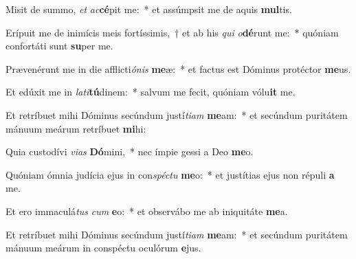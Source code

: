 \item Misit de summo, \textit{et} \textit{ac}\textbf{cé}pit me:~* et assúmpsit me de aquis \textbf{mul}tis.
\item Erípuit me de inimícis meis fortíssimis,~† et ab his \textit{qui} \textit{o}\textbf{dé}runt me:~* quóniam confortáti sunt \textbf{su}per me.
\item Prævenérunt me in die afflicti\textit{ó}\textit{nis} \textbf{me}æ:~* et factus est Dóminus protéctor \textbf{me}us.
\item Et edúxit me in \textit{la}\textit{ti}\textbf{tú}dinem:~* salvum me fecit, quóniam vólu\textbf{it} me.
\item Et retríbuet mihi Dóminus secúndum justí\textit{ti}\textit{am} \textbf{me}am:~* et secúndum puritátem mánuum meárum retríbuet \textbf{mi}hi:
\item Quia custodívi \textit{vi}\textit{as} \textbf{Dó}mini,~* nec ímpie gessi a Deo \textbf{me}o.
\item Quóniam ómnia judícia ejus in con\textit{spéc}\textit{tu} \textbf{me}o:~* et justítias ejus non répuli \textbf{a} me.
\item Et ero immaculá\textit{tus} \textit{cum} \textbf{e}o:~* et observábo me ab iniquitáte \textbf{me}a.
\item Et retríbuet mihi Dóminus secúndum justí\textit{ti}\textit{am} \textbf{me}am:~* et secúndum puritátem mánuum meárum in conspéctu oculórum \textbf{e}jus.
